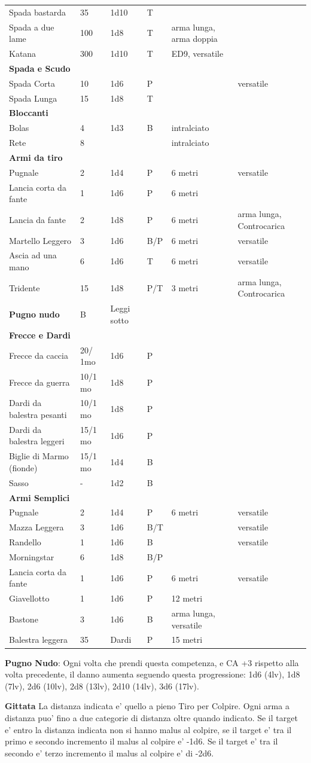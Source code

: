 \documentclass[a4paper,11pt,twoside,openany]{dndbook}
\begin{document}
{\begin{longtable}{|L{3.5cm} |k{1cm} |k{1.5cm}| k{1cm} |L{4.5cm} |k{3cm}|}
	Spada bastarda & 35 & 1d10 & T & & \tabularnewline
	Spada a due lame & 100 & 1d8 & T & arma lunga, arma doppia & \tabularnewline
	Katana & 300 & 1d10 & T & ED9, versatile & \tabularnewline
	\textbf{Spada e Scudo} & & & & & \tabularnewline
	Spada Corta & 10 & 1d6 & P & & versatile\tabularnewline
	Spada Lunga & 15 & 1d8 & T & & \tabularnewline
	\textbf{Bloccanti} & & & & & \tabularnewline
	Bolas & 4 & 1d3 & B & intralciato & \tabularnewline
	Rete & 8 & & & intralciato & \tabularnewline
	\textbf{Armi da tiro} & & & & & \tabularnewline
	Pugnale & 2 & 1d4 & P & 6 metri & versatile\tabularnewline
	Lancia corta da fante & 1 & 1d6 & P & 6 metri & \tabularnewline
	Lancia da fante & 2 & 1d8 & P & 6 metri &arma lunga, Controcarica\tabularnewline
	Martello Leggero & 3 & 1d6 & B/P & 6 metri & versatile\tabularnewline
	Ascia ad una mano & 6 & 1d6 & T & 6 metri & versatile\tabularnewline
	Tridente & 15 & 1d8 & P/T & 3 metri&arma lunga, Controcarica \tabularnewline
	\textbf{Pugno nudo} & B & Leggi sotto & & & \tabularnewline
	\textbf{Frecce e Dardi} & & & & & \tabularnewline
	Frecce da caccia & 20/ 1mo & 1d6 & P & & \tabularnewline
	Frecce da guerra & 10/1 mo & 1d8 & P & & \tabularnewline
	Dardi da balestra pesanti & 10/1 mo & 1d8 & P & & \tabularnewline
	Dardi da balestra leggeri & 15/1 mo & 1d6 & P & & \tabularnewline
	Biglie di Marmo (fionde) & 15/1 mo & 1d4 & B & & \tabularnewline
	Sasso & - & 1d2 & B & & \tabularnewline
	\textbf{Armi Semplici} & & & & & \tabularnewline
	Pugnale & 2 & 1d4 & P & 6 metri & versatile\tabularnewline
	Mazza Leggera & 3 & 1d6 & B/T & & versatile\tabularnewline
	Randello & 1 & 1d6 & B & & versatile\tabularnewline
	Morningstar & 6 & 1d8 & B/P & & \tabularnewline
	Lancia corta da fante & 1 & 1d6 & P & 6 metri & versatile\tabularnewline
	Giavellotto & 1 & 1d6 & P & 12 metri & \tabularnewline
	Bastone & 3 & 1d6 & B & arma lunga, versatile & \tabularnewline
	Balestra leggera & 35 & Dardi & P & 15 metri & \tabularnewline
\end{longtable}

\textbf{Pugno Nudo}: Ogni volta che prendi questa competenza, e CA +3 rispetto alla volta precedente, il danno aumenta seguendo questa progressione: 1d6 (4lv), 1d8 (7lv), 2d6 (10lv), 2d8 (13lv), 2d10 (14lv), 3d6 (17lv). 

\bigskip

\textbf{Gittata}
La distanza indicata e' quello a pieno Tiro per Colpire. Ogni arma a distanza puo' fino a due categorie di distanza oltre quando indicato. Se il target e' entro la distanza indicata non si hanno malus al colpire, se il target e' tra il primo e secondo incremento il malus al colpire e' -1d6. Se il target e' tra il secondo e' terzo incremento il malus al colpire e' di -2d6.

}
\end{document}
